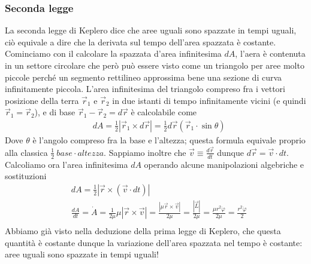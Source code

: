 \subsubsection{Seconda legge}
La seconda legge di Keplero dice che aree uguali sono spazzate in tempi uguali, ciò equivale a dire che la derivata sul tempo dell'area spazzata è costante. Cominciamo con il calcolare la spazzata d'area infinitesima $dA$, l'aera è contenuta in un settore circolare che però può essere visto come un triangolo per aree molto piccole perché un segmento rettilineo approssima bene una sezione di curva infinitamente piccola. L'area infinitesima del triangolo compreso fra i vettori posizione della terra $\vec{r}_1$ e $\vec{r}_2$ in due istanti di tempo infinitamente vicini (e quindi $\vec{r}_1=\vec{r}_2$), e di base $\vec{r}_1-\vec{r}_2 = d\vec{r}$ è calcolabile come 
\begin{align*}
	&dA = \frac{1}{2}|\vec{r}_1\times d\vec{r}|=\frac{1}{2}d\vec{r}(\vec{r}_1 \cdot \sin\theta)
\end{align*}
Dove $\theta$ è l'angolo compreso fra la base e l'altezza; questa formula equivale proprio alla classica $\frac{1}{2}\  base \cdot altezza$.
Sappiamo inoltre che $\vec{v}\equiv \frac{d\vec{r}}{dt}$ dunque $d\vec{r} = \vec{v}\cdot dt$. Calcoliamo ora l'area infinitesima $dA$ operando alcune manipolazioni algebriche e sostituzioni
\begin{align*}
&dA = \frac{1}{2}|\vec{r}\times( \vec{v}\cdot dt)|\\
&\frac{dA}{dt} =\dot{A} = \frac{1}{2\mu}\mu|\vec{r}\times \vec{v}|= \frac{|\mu \vec{r}\times \vec{v}|}{2\mu}= \frac{|\vec{L}|}{2\mu}= \frac{\mu r^2\dot\varphi}{2\mu}=\frac{r^2\dot\varphi}{2} \\
\end{align*}
Abbiamo già visto nella deduzione della prima legge di Keplero, che questa quantità è costante dunque la variazione dell'area spazzata nel tempo è costante: aree uguali sono spazzate in tempi uguali!
